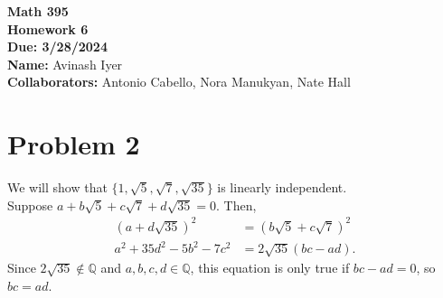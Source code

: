 \documentclass[11pt]{extarticle}
\title{}
\author{}
\date{}
\newcommand{\Q}{\mathbb{Q}}
\begin{document}
  \begin{center}
    {\bf \Large Math 395 \\[0.1in]Homework 6 \\[0.1in]
    Due: 3/28/2024}\\[.25in]
    {\bf Name:} {Avinash Iyer}\\[0.15in]
    {\bf Collaborators:} {Antonio Cabello, Nora Manukyan, Nate Hall} \\
  \end{center}
  \section{Problem 2}%
  We will show that $\{1,\sqrt{5},\sqrt{7},\sqrt{35}\}$ is linearly independent.\\

  Suppose $a + b\sqrt{5} + c\sqrt{7} + d\sqrt{35} = 0$. Then,
  \begin{align*}
    \left(a+d\sqrt{35}\right)^2 &= \left(b\sqrt{5} + c\sqrt{7}\right)^2\\
    a^2 + 35d^2 - 5b^2 - 7c^2 &= 2\sqrt{35}\left(bc-ad\right).
  \end{align*}
  Since $2\sqrt{35}\notin \Q$ and $a,b,c,d\in \Q$, this equation is only true if $bc-ad = 0$, so $bc = ad$.
\end{document}
